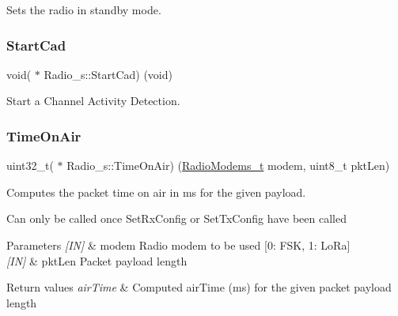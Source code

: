 Sets the radio in standby mode. 

\mbox{\label{group__LORA_ga8f9e97d8a3010e96e108dc62c1e5b107}} 
\subsubsection{\texorpdfstring{Start\+Cad}{StartCad}}
{\footnotesize\ttfamily void( $\ast$ Radio\+\_\+s\+::\+Start\+Cad) (void)}



Start a Channel Activity Detection. 

\mbox{\label{group__LORA_ga36552db411e04e05c7962912854d48ae}} 
\subsubsection{\texorpdfstring{Time\+On\+Air}{TimeOnAir}}
{\footnotesize\ttfamily uint32\+\_\+t( $\ast$ Radio\+\_\+s\+::\+Time\+On\+Air) (\hyperlink{group__LORA_ga992ef7a5b7f52975ba7bd8dd97740057}{Radio\+Modems\+\_\+t} modem, uint8\+\_\+t pkt\+Len)}



Computes the packet time on air in ms for the given payload. 

Can only be called once Set\+Rx\+Config or Set\+Tx\+Config have been called


\begin{DoxyParams}{Parameters}
{\em \mbox{[}\+I\+N\mbox{]}} & modem Radio modem to be used \mbox{[}0\+: F\+SK, 1\+: Lo\+Ra\mbox{]} \\
\hline
{\em \mbox{[}\+I\+N\mbox{]}} & pkt\+Len Packet payload length\\
\hline
\end{DoxyParams}

\begin{DoxyRetVals}{Return values}
{\em air\+Time} & Computed air\+Time (ms) for the given packet payload length \\
\hline
\end{DoxyRetVals}
\mbox{\label{group__LORA_gafe2bdc503d6c09946dee1b800e2fb3a2}} 
